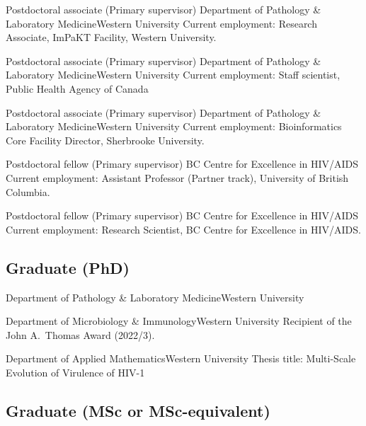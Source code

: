 {Postdoctoral associate (Primary supervisor)}
{Department of Pathology \& Laboratory Medicine}{Western University}
{Current employment: Research Associate, ImPaKT Facility, Western University.}


{Postdoctoral associate (Primary supervisor)}
{Department of Pathology \& Laboratory Medicine}{Western University}
{Current employment: Staff scientist, Public Health Agency of Canada}


{Postdoctoral associate (Primary supervisor)}
{Department of Pathology \& Laboratory Medicine}{Western University}
{Current employment: Bioinformatics Core Facility Director, Sherbrooke University.}

{Postdoctoral fellow (Primary supervisor)}
{BC Centre for Excellence in HIV/AIDS}{}
{Current employment: Assistant Professor (Partner track), University of British Columbia.}

{Postdoctoral fellow (Primary supervisor)}
{BC Centre for Excellence in HIV/AIDS}{}
{Current employment: Research Scientist, BC Centre for Excellence in HIV/AIDS.}



\subsection {Graduate (PhD)}

{Department of Pathology \& Laboratory Medicine}{Western University}
{}

{Department of Microbiology \& Immunology}{Western University}
{Recipient of the John A.~Thomas Award (2022/3).}

{Department of Applied Mathematics}{Western University}
{Thesis title: Multi-Scale Evolution of Virulence of HIV-1}



\subsection {Graduate (MSc or MSc-equivalent)}

